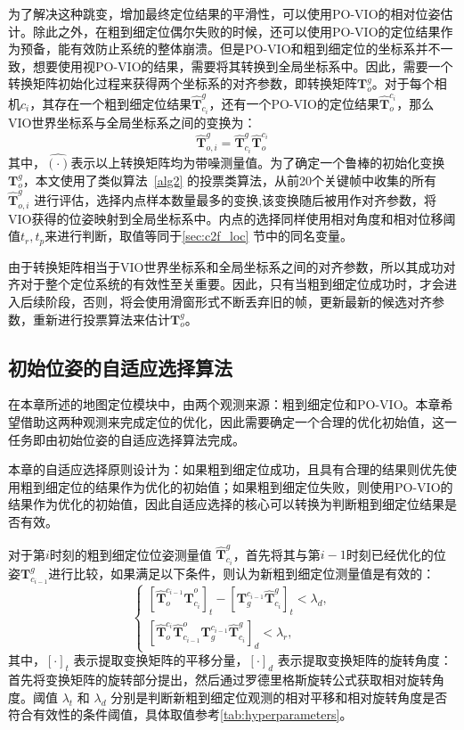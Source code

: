 为了解决这种跳变，增加最终定位结果的平滑性，可以使用PO-VIO的相对位姿估计。除此之外，在粗到细定位偶尔失败的时候，还可以使用PO-VIO的定位结果作为预备，能有效防止系统的整体崩溃。但是PO-VIO和粗到细定位的坐标系并不一致，想要使用视PO-VIO的结果，需要将其转换到全局坐标系中。因此，需要一个转换矩阵初始化过程来获得两个坐标系的对齐参数，即转换矩阵$\symbf{T}_o^{g}$。对于每个相机$c_i$，其存在一个粗到细定位结果$\hat{\symbf{T}}^{g}_{c_i}$，还有一个PO-VIO的定位结果$\hat{\symbf{T}}_{o}^{c_i}$，那么VIO世界坐标系与全局坐标系之间的变换为：
\begin{equation}
    \hat{\symbf{T}}_{o,i}^g = {\hat{\symbf{T}}^{g}_{c_i}} \hat{\symbf{T}}_{o}^{c_i}
\end{equation}
其中，${\hat{(\cdot)}}$表示以上转换矩阵均为带噪测量值。为了确定一个鲁棒的初始化变换$\symbf{T}_{o}^g$，本文使用了类似算法~\ref{alg2} 的投票类算法，从前20个关键帧中收集的所有$\hat{\symbf{T}}_{o,i}^g$ 进行评估，选择内点样本数量最多的变换,该变换随后被用作对齐参数，将VIO获得的位姿映射到全局坐标系中。内点的选择同样使用相对角度和相对位移阈值$t_r,t_p$来进行判断，取值等同于\ref{sec:c2f_loc} 节中的同名变量。

由于转换矩阵相当于VIO世界坐标系和全局坐标系之间的对齐参数，所以其成功对齐对于整个定位系统的有效性至关重要。因此，只有当粗到细定位成功时，才会进入后续阶段，否则，将会使用滑窗形式不断丢弃旧的帧，更新最新的候选对齐参数，重新进行投票算法来估计$\symbf{T}_o^{g}$。

\subsection{初始位姿的自适应选择算法}
\label{sec:valid}

在本章所述的地图定位模块中，由两个观测来源：粗到细定位和PO-VIO。本章希望借助这两种观测来完成定位的优化，因此需要确定一个合理的优化初始值，这一任务即由初始位姿的自适应选择算法完成。

本章的自适应选择原则设计为：如果粗到细定位成功，且具有合理的结果则优先使用粗到细定位的结果作为优化的初始值；如果粗到细定位失败，则使用PO-VIO的结果作为优化的初始值，因此自适应选择的核心可以转换为判断粗到细定位结果是否有效。

对于第$i$时刻的粗到细定位位姿测量值 ${\hat{\symbf{T}}^{g}_{c_i}}$，首先将其与第$i-1$时刻已经优化的位姿${\symbf{T}}^{g}_{c_{i-1}}$进行比较，如果满足以下条件，则认为新粗到细定位测量值是有效的：
\begin{equation}
\label{eq:check}
\begin{cases}
    [\hat{\symbf{T}}_{o}^{c_{i-1}}\hat{\symbf{T}}^{o}_{c_i}]_{t} - [\symbf{T}_{g}^{c_{i-1}}\hat{\symbf{T}}^{g}_{c_i}]_{t} < \lambda_{d}, \\
    [\hat{\symbf{T}}^{c_i}_o \hat{\symbf{T}}_{c_{i-1}}^o \symbf{T}^{c_{i-1}}_g \hat{\symbf{T}}_{c_{i}}^g]_{d} < \lambda_{r},
\end{cases}
\end{equation}
其中，$[\cdot]_{t}$ 表示提取变换矩阵的平移分量，$[\cdot]_{d}$ 表示提取变换矩阵的旋转角度：首先将变换矩阵的旋转部分提出，然后通过罗德里格斯旋转公式获取相对旋转角度。阈值 $\lambda_{t}$ 和 $\lambda_{d}$ 分别是判断新粗到细定位观测的相对平移和相对旋转角度是否符合有效性的条件阈值，具体取值参考\ref{tab:hyperparameters}。

